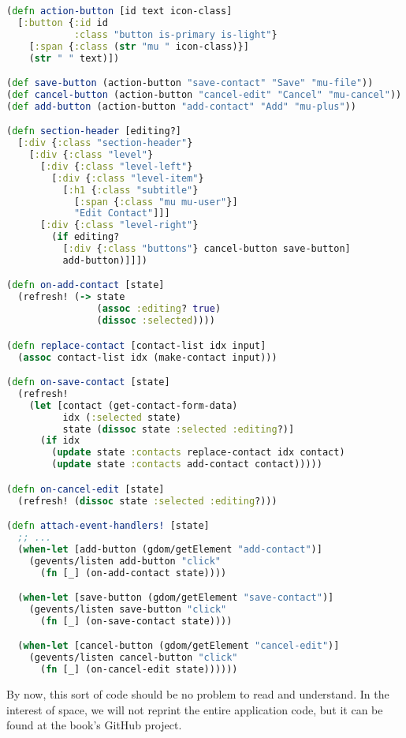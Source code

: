 \documentclass[10pt,twoside,openright]{memoir}
\begin{document}
\begin{lstlisting}[language=Clojure]
(defn action-button [id text icon-class]
  [:button {:id id
            :class "button is-primary is-light"}
    [:span {:class (str "mu " icon-class)}]
    (str " " text)])

(def save-button (action-button "save-contact" "Save" "mu-file"))
(def cancel-button (action-button "cancel-edit" "Cancel" "mu-cancel"))
(def add-button (action-button "add-contact" "Add" "mu-plus"))

(defn section-header [editing?]
  [:div {:class "section-header"}
    [:div {:class "level"}
      [:div {:class "level-left"}
        [:div {:class "level-item"}
          [:h1 {:class "subtitle"}
            [:span {:class "mu mu-user"}]
            "Edit Contact"]]]
      [:div {:class "level-right"}
        (if editing?
          [:div {:class "buttons"} cancel-button save-button]
          add-button)]]])

(defn on-add-contact [state]
  (refresh! (-> state
                (assoc :editing? true)
                (dissoc :selected))))

(defn replace-contact [contact-list idx input]
  (assoc contact-list idx (make-contact input)))

(defn on-save-contact [state]
  (refresh!
    (let [contact (get-contact-form-data)
          idx (:selected state)
          state (dissoc state :selected :editing?)]
      (if idx
        (update state :contacts replace-contact idx contact)
        (update state :contacts add-contact contact)))))

(defn on-cancel-edit [state]
  (refresh! (dissoc state :selected :editing?)))

(defn attach-event-handlers! [state]
  ;; ...
  (when-let [add-button (gdom/getElement "add-contact")]
    (gevents/listen add-button "click"
      (fn [_] (on-add-contact state))))

  (when-let [save-button (gdom/getElement "save-contact")]
    (gevents/listen save-button "click"
      (fn [_] (on-save-contact state))))

  (when-let [cancel-button (gdom/getElement "cancel-edit")]
    (gevents/listen cancel-button "click"
      (fn [_] (on-cancel-edit state))))))
\end{lstlisting}

By now, this sort of code should be no problem to read and understand.
In the interest of space, we will not reprint the entire application
code, but it can be found at the book's GitHub project.
\end{document}
